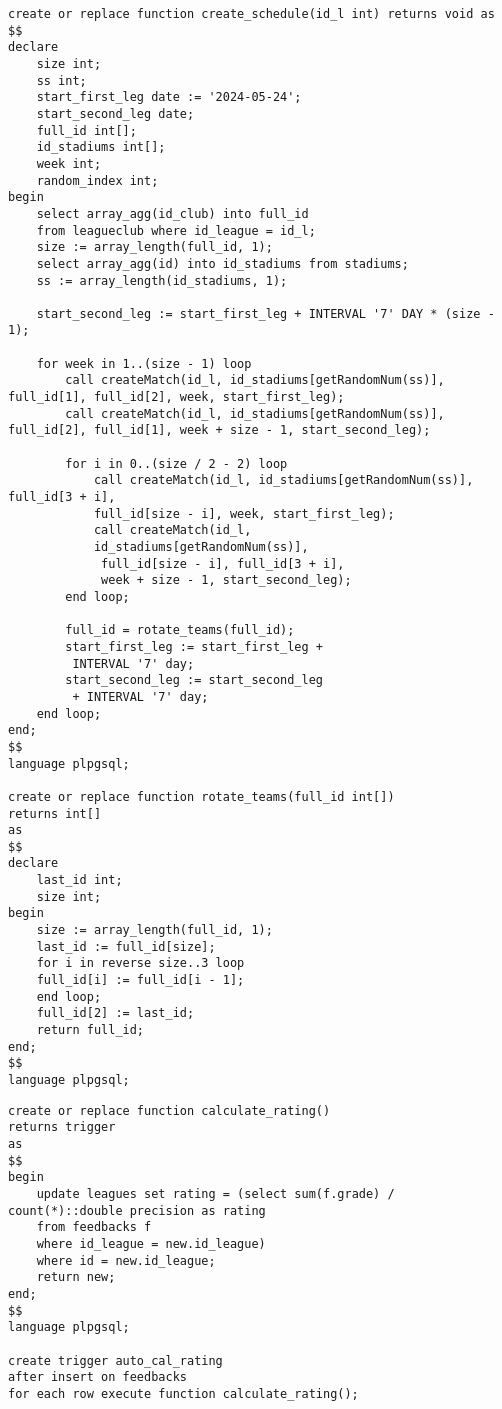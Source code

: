 \begin{lstlisting}[caption={Функция составляет турнирное расписание}, label={lst:f1}]
create or replace function create_schedule(id_l int) returns void as $$
declare
	size int;
	ss int;
	start_first_leg date := '2024-05-24';
	start_second_leg date;
	full_id int[];
	id_stadiums int[];
	week int;
	random_index int;
begin
	select array_agg(id_club) into full_id 
	from leagueclub where id_league = id_l;
	size := array_length(full_id, 1);
	select array_agg(id) into id_stadiums from stadiums;
	ss := array_length(id_stadiums, 1);
	
	start_second_leg := start_first_leg + INTERVAL '7' DAY * (size - 1);
	
	for week in 1..(size - 1) loop
		call createMatch(id_l, id_stadiums[getRandomNum(ss)], full_id[1], full_id[2], week, start_first_leg);
		call createMatch(id_l, id_stadiums[getRandomNum(ss)], full_id[2], full_id[1], week + size - 1, start_second_leg);
	
		for i in 0..(size / 2 - 2) loop
			call createMatch(id_l, id_stadiums[getRandomNum(ss)], full_id[3 + i], 
			full_id[size - i], week, start_first_leg);
			call createMatch(id_l, 
			id_stadiums[getRandomNum(ss)],
			 full_id[size - i], full_id[3 + i], 
			 week + size - 1, start_second_leg);			
		end loop;
		
		full_id = rotate_teams(full_id);
		start_first_leg := start_first_leg +
		 INTERVAL '7' day;
		start_second_leg := start_second_leg
		 + INTERVAL '7' day;
	end loop;
end;
$$
language plpgsql;

create or replace function rotate_teams(full_id int[])
returns int[] 
as
$$
declare
	last_id int;
	size int;
begin
	size := array_length(full_id, 1);
	last_id := full_id[size];
	for i in reverse size..3 loop
	full_id[i] := full_id[i - 1];
	end loop;
	full_id[2] := last_id;
	return full_id;
end;
$$
language plpgsql;
\end{lstlisting}

\begin{lstlisting}[caption={Реализация триггера}, label={lst:trigger}]
create or replace function calculate_rating()
returns trigger
as
$$
begin
	update leagues set rating = (select sum(f.grade) / count(*)::double precision as rating
	from feedbacks f
	where id_league = new.id_league)
	where id = new.id_league;
	return new;
end;
$$
language plpgsql;

create trigger auto_cal_rating
after insert on feedbacks
for each row execute function calculate_rating();
\end{lstlisting}

